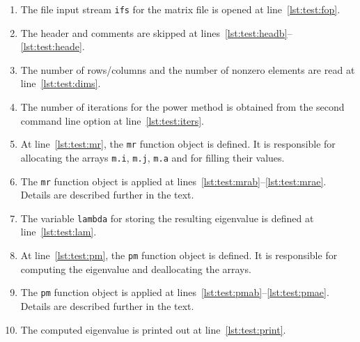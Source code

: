 \documentclass[10pt,a4paper]{article}
\theoremstyle{definition}\newtheorem{problem}{Problem}
\begin{document}
\begin{enumerate}

\item The file input stream \texttt{ifs} for the matrix file is opened at line~\ref{lst:test:fop}.

\item The header and comments are skipped at lines~\ref{lst:test:headb}--\ref{lst:test:heade}.

\item The number of rows/columns and the number of nonzero elements are read at line~\ref{lst:test:dims}.

\item The number of iterations for the power method is obtained from the second command line option at line~\ref{lst:test:iters}.

\item At line~\ref{lst:test:mr}, the \texttt{mr} function object is defined. It is responsible for allocating the arrays \texttt{m.i}, \texttt{m.j}, \texttt{m.a} and for filling their values.

\item The \texttt{mr} function object is applied at lines~\ref{lst:test:mrab}--\ref{lst:test:mrae}. Details are described further in the text.

\item The variable \texttt{lambda} for storing the resulting eigenvalue is defined at line~\ref{lst:test:lam}.

\item At line~\ref{lst:test:pm}, the \texttt{pm} function object is defined. It is responsible for computing the eigenvalue and deallocating the arrays.

\item The \texttt{pm} function object is applied at lines~\ref{lst:test:pmab}--\ref{lst:test:pmae}. Details are described further in the text.

\item The computed eigenvalue is printed out at line~\ref{lst:test:print}.

\end{enumerate}
\end{document}
